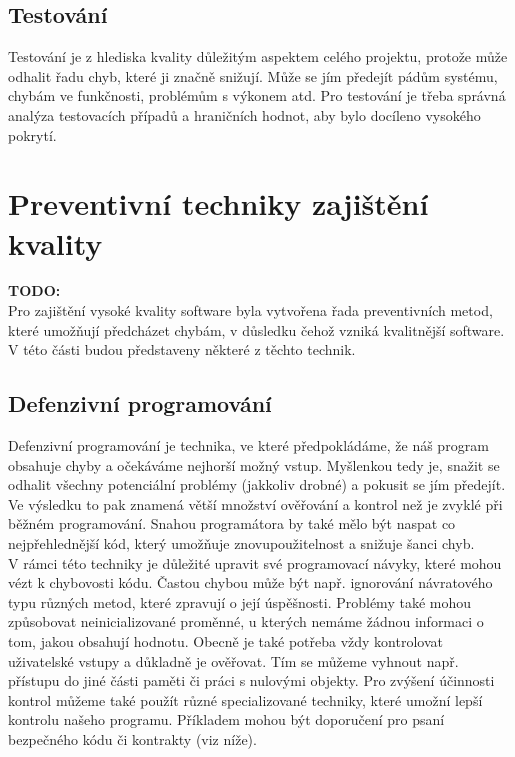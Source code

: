 	\subsection{Testování}
		Testování je z hlediska kvality důležitým aspektem celého projektu, protože může odhalit řadu chyb, které ji značně snižují. Může se jím předejít pádům systému, chybám ve funkčnosti, problémům s výkonem atd. Pro testování je třeba správná analýza testovacích případů a hraničních hodnot, aby bylo docíleno vysokého pokrytí.
	
	
\section{Preventivní techniky zajištění kvality}
	\textbf{\textcolor{pblue}{TODO: }}\\
	
	Pro zajištění vysoké kvality software byla vytvořena řada preventivních metod, které umožňují předcházet chybám, v důsledku čehož vzniká kvalitnější software. V této části budou představeny některé z těchto technik.
		

	\subsection{Defenzivní programování}
		Defenzivní programování \cite{defProgram} je technika, ve které předpokládáme, že náš program obsahuje chyby a očekáváme nejhorší možný vstup. Myšlenkou tedy je, snažit se odhalit všechny potenciální problémy (jakkoliv drobné) a pokusit se jím předejít. Ve výsledku to pak znamená větší množství ověřování a kontrol než je zvyklé při běžném programování. Snahou programátora by také mělo být naspat co nejpřehlednější kód, který umožňuje znovupoužitelnost a snižuje šanci chyb.\\ 
		
		V rámci této techniky je důležité upravit své programovací návyky, které mohou vézt k chybovosti kódu. Častou chybou může být např. ignorování návratového typu různých metod, které zpravují o její úspěšnosti. Problémy také mohou způsobovat neinicializované proměnné, u kterých nemáme žádnou informaci o tom, jakou obsahují hodnotu. Obecně je také potřeba vždy kontrolovat uživatelské vstupy a důkladně je ověřovat. Tím se můžeme vyhnout např. přístupu do jiné části paměti či práci s nulovými objekty. Pro zvýšení účinnosti kontrol můžeme také použít různé specializované techniky, které umožní lepší kontrolu našeho programu. Příkladem mohou být doporučení pro psaní bezpečného kódu či kontrakty (viz níže).\\
		
